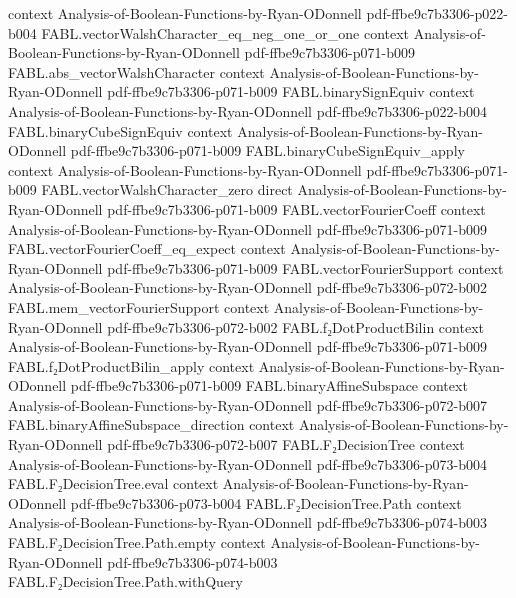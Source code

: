 \begin{theorem}
  {context}
  {Analysis-of-Boolean-Functions-by-Ryan-ODonnell}
  {pdf-ffbe9c7b3306-p022-b004}
\proofstep
  {FABL.vectorWalshCharacter_eq_neg_one_or_one}
  {context}
  {Analysis-of-Boolean-Functions-by-Ryan-ODonnell}
  {pdf-ffbe9c7b3306-p071-b009}
\proofstep
  {FABL.abs_vectorWalshCharacter}
  {context}
  {Analysis-of-Boolean-Functions-by-Ryan-ODonnell}
  {pdf-ffbe9c7b3306-p071-b009}
\proofstep
  {FABL.binarySignEquiv}
  {context}
  {Analysis-of-Boolean-Functions-by-Ryan-ODonnell}
  {pdf-ffbe9c7b3306-p022-b004}
\proofstep
  {FABL.binaryCubeSignEquiv}
  {context}
  {Analysis-of-Boolean-Functions-by-Ryan-ODonnell}
  {pdf-ffbe9c7b3306-p071-b009}
\proofstep
  {FABL.binaryCubeSignEquiv_apply}
  {context}
  {Analysis-of-Boolean-Functions-by-Ryan-ODonnell}
  {pdf-ffbe9c7b3306-p071-b009}
\proofstep
  {FABL.vectorWalshCharacter_zero}
  {direct}
  {Analysis-of-Boolean-Functions-by-Ryan-ODonnell}
  {pdf-ffbe9c7b3306-p071-b009}
\proofstep
  {FABL.vectorFourierCoeff}
  {context}
  {Analysis-of-Boolean-Functions-by-Ryan-ODonnell}
  {pdf-ffbe9c7b3306-p071-b009}
\proofstep
  {FABL.vectorFourierCoeff_eq_expect}
  {context}
  {Analysis-of-Boolean-Functions-by-Ryan-ODonnell}
  {pdf-ffbe9c7b3306-p071-b009}
\proofstep
  {FABL.vectorFourierSupport}
  {context}
  {Analysis-of-Boolean-Functions-by-Ryan-ODonnell}
  {pdf-ffbe9c7b3306-p072-b002}
\proofstep
  {FABL.mem_vectorFourierSupport}
  {context}
  {Analysis-of-Boolean-Functions-by-Ryan-ODonnell}
  {pdf-ffbe9c7b3306-p072-b002}
\proofstep
  {FABL.f₂DotProductBilin}
  {context}
  {Analysis-of-Boolean-Functions-by-Ryan-ODonnell}
  {pdf-ffbe9c7b3306-p071-b009}
\proofstep
  {FABL.f₂DotProductBilin_apply}
  {context}
  {Analysis-of-Boolean-Functions-by-Ryan-ODonnell}
  {pdf-ffbe9c7b3306-p071-b009}
\proofstep
  {FABL.binaryAffineSubspace}
  {context}
  {Analysis-of-Boolean-Functions-by-Ryan-ODonnell}
  {pdf-ffbe9c7b3306-p072-b007}
\proofstep
  {FABL.binaryAffineSubspace_direction}
  {context}
  {Analysis-of-Boolean-Functions-by-Ryan-ODonnell}
  {pdf-ffbe9c7b3306-p072-b007}
\proofstep
  {FABL.F₂DecisionTree}
  {context}
  {Analysis-of-Boolean-Functions-by-Ryan-ODonnell}
  {pdf-ffbe9c7b3306-p073-b004}
\proofstep
  {FABL.F₂DecisionTree.eval}
  {context}
  {Analysis-of-Boolean-Functions-by-Ryan-ODonnell}
  {pdf-ffbe9c7b3306-p073-b004}
\proofstep
  {FABL.F₂DecisionTree.Path}
  {context}
  {Analysis-of-Boolean-Functions-by-Ryan-ODonnell}
  {pdf-ffbe9c7b3306-p074-b003}
\proofstep
  {FABL.F₂DecisionTree.Path.empty}
  {context}
  {Analysis-of-Boolean-Functions-by-Ryan-ODonnell}
  {pdf-ffbe9c7b3306-p074-b003}
\proofstep
  {FABL.F₂DecisionTree.Path.withQuery}

\end{theorem}
